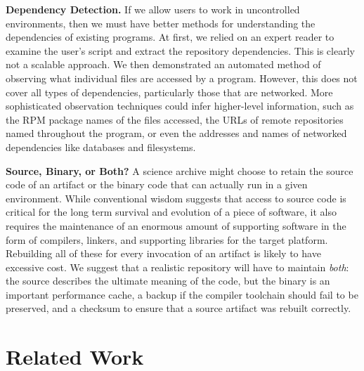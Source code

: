\documentclass{sig-alternate}
\begin{document}
{\bf Dependency Detection.}  If we allow users to work in uncontrolled
environments, then we must have better methods for understanding the dependencies  of existing programs.  At first, we relied on an expert reader to examine
the user's script and extract the repository dependencies.  This is clearly
not a scalable approach.  We then demonstrated an automated method of observing
what individual files are accessed by a program. However, this does
not cover all types of dependencies, particularly those that are networked.
More sophisticated observation techniques could infer higher-level information,
such as the RPM package names of the files accessed, the URLs of remote
repositories named throughout the program, or even the addresses and names of networked dependencies like databases and filesystems.

{\bf Source, Binary, or Both?}  A science archive might choose to retain
the source code of an artifact or the binary code that can actually run in a given environment.
While conventional wisdom suggests that access to source code is critical for the long term
survival and evolution of a piece of software, it also requires the maintenance of an enormous
amount of supporting software in the form of compilers, linkers, and supporting libraries for
the target platform.  Rebuilding all of these for every invocation of an artifact is
likely to have excessive cost.  We suggest that a realistic repository will have to
maintain \emph{both}: the source describes the ultimate meaning of the code, but
the binary is an important performance cache, a backup if the compiler toolchain should
fail to be preserved, and a checksum to ensure that a source artifact was rebuilt correctly.

\section{Related Work }
\end{document}
